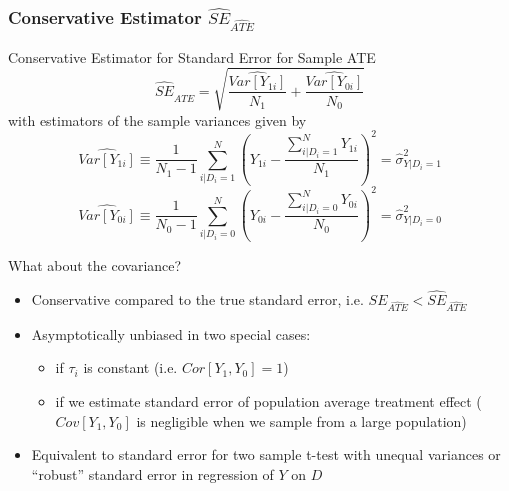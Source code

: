 \documentclass{beamer}
\numberwithin{equation}{section}
\begin{document}
\begin{frame}
  \frametitle{Conservative Estimator $\widehat{SE}_{\widehat{ATE}}$}
\scriptsize
\begin{block}{Conservative Estimator for Standard Error for Sample ATE}
\[
  \widehat{ SE}_{\widehat{ATE}} = \sqrt{ \frac{\widehat{Var[Y_{1i}]}}{N_1}+\frac{\widehat{Var[Y_{0i}]}}{N_0} } %
   \]
with estimators of the sample variances given by\[
\widehat{Var[Y_{1i}]}\equiv  \frac{1}{N_1-1} \sum_{i|D_i=1}^N \left(Y_{1i} -  \frac{\sum_{i|D_i=1}^N Y_{1i}}{N_1} \right)^2= \widehat{\sigma}^2_{Y|D_i=1}
\]
\[
\widehat{Var[Y_{0i}]}\equiv \frac{1}{N_0-1} \sum_{i|D_i=0}^N \left(Y_{0i} -  \frac{\sum_{i|D_i=0}^N Y_{0i}}{N_0} \right)^2=  \widehat{\sigma}^2_{Y|D_i=0}
\]
\end{block}
\begin{overprint}
What about the covariance?
\begin{itemize}
\item Conservative compared to the true standard error, i.e. $SE_{\widehat{ATE}} < \widehat{ SE}_{\widehat{ATE}}$
\item Asymptotically unbiased in two special cases:
  \begin{itemize}
  \item if $\tau_i$ is constant (i.e. $Cor[Y_1,Y_0]=1$) 
  \item if we estimate standard error of population average treatment effect ($Cov[Y_1,Y_0]$ is negligible when we sample from a large population)
  \end{itemize}
 \item Equivalent to standard error for two sample t-test with unequal variances or ``robust'' standard error in regression of $Y$ on $D$
\end{itemize}
\end{overprint}
\end{frame}
\end{document}
